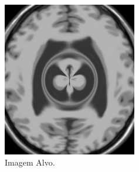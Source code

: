 \documentclass[t]{beamer}
\begin{document}
\begin{frame}
\begin{columns}[c]
\begin{figure}[!h]
\begin{center}
            \includegraphics[width=0.9\textwidth]{../images/movingImageDist.png}
            \caption{Imagem Alvo.}
          \end{center}
        \end{figure}
    \end{columns}
\end{frame}
\end{document}
